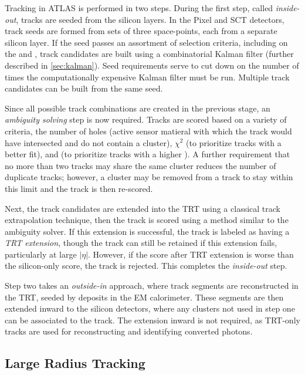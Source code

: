 Tracking in ATLAS is performed in two steps. During the first step, called \emph{inside-out}, tracks are seeded from the silicon layers. In the Pixel and \ac{SCT} detectors, track seeds are formed from sets of three space-points, each from a separate silicon layer. If the seed passes an assortment of selection criteria, including on the \pt and \dzero, track candidates are built using a combinatorial Kalman filter (further described in \autoref{sec:kalman}). Seed requirements serve to cut down on the number of times the computationally expensive Kalman filter must be run. Multiple track candidates can be built from the same seed.

Since all possible track combinations are created in the previous stage, an \emph{ambiguity solving} step is now required. Tracks are scored based on a variety of criteria, the number of holes (active sensor matieral with which the track would have intersected and do not contain a cluster), $\chi^{2}$ (to prioritize tracks with a better fit), and \pt (to prioritize tracks with a higher \pt). A further requirement that no more than two tracks may share the same cluster reduces the number of duplicate tracks; however, a cluster may be removed from a track to stay within this limit and the track is then re-scored. 

Next, the track candidates are extended into the  \ac{TRT} using a classical track extrapolation technique, then the track is scored using a method similar to the ambiguity solver. If this extension is successful, the track is labeled as having a \emph{\ac{TRT} extension}, though the track can still be retained if this extension fails, particularly at large $|\eta|$. However, if the score after TRT extension is worse than the silicon-only score, the track is rejected. This completes the \emph{inside-out} step.


Step two takes an \emph{outside-in} approach, where track segments are reconstructed in the \ac{TRT}, seeded by deposits in the \ac{EM} calorimeter. These segments are then extended inward to the silicon detectors, where any clusters not used in step one can be associated to the track. The extension inward is not required, as \ac{TRT}-only tracks are used for reconstructing and identifying converted photons. 



\subsection{Large Radius Tracking}

